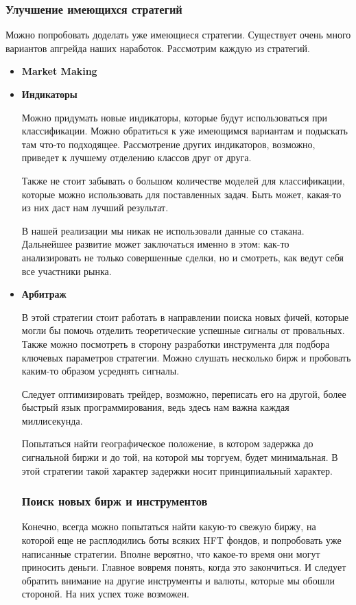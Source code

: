 \subsubsection{Улучшение имеющихся стратегий}
Можно попробовать доделать уже имеющиеся стратегии. Существует очень много вариантов апгрейда наших наработок. Рассмотрим каждую из стратегий.
\begin{itemize}
    \item \textbf{Market Making}
    \item \textbf{Индикаторы}
    
    Можно придумать новые индикаторы, которые будут использоваться при классификации. Можно обратиться к уже имеющимся вариантам и подыскать там что-то подходящее. Рассмотрение других индикаторов, возможно, приведет к лучшему отделению классов друг от друга. 
    
    Также не стоит забывать о большом количестве моделей для классификации, которые можно использовать для поставленных задач. Быть может, какая-то из них даст нам лучший результат.
    
    В нашей реализации мы никак не использовали данные со стакана. Дальнейшее развитие может заключаться именно в этом: как-то анализировать не только совершенные сделки, но и смотреть, как ведут себя все участники рынка.
    \item \textbf{Арбитраж}
    
    В этой стратегии стоит работать в направлении поиска новых фичей, которые могли бы помочь отделить теоретические успешные сигналы от провальных. Также можно посмотреть в сторону разработки инструмента для подбора ключевых параметров стратегии. Можно слушать несколько бирж и пробовать каким-то образом усреднять сигналы. 
    
    Следует оптимизировать трейдер, возможно, переписать его на другой, более быстрый язык программирования, ведь здесь нам важна каждая миллисекунда.
    
    Попытаться найти географическое положение, в котором задержка до сигнальной биржи и до той, на которой мы торгуем, будет минимальная. В этой стратегии такой характер задержки носит принципиальный характер.

\subsubsection{Поиск новых бирж и инструментов}
Конечно, всегда можно попытаться найти какую-то свежую биржу, на которой еще не расплодились боты всяких HFT фондов, и попробовать уже написанные стратегии. Вполне вероятно, что какое-то время они могут приносить деньги. Главное вовремя понять, когда это закончиться. И следует обратить внимание на другие инструменты и валюты, которые мы обошли стороной. На них успех тоже возможен.


\end{itemize}
